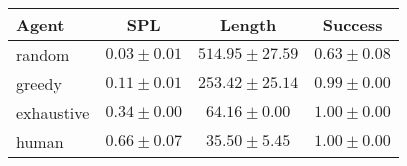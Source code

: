 \begin{tabular}{lccc}
    \toprule
    Agent & SPL & Length & Success \\
    \midrule
    random & $0.03 \pm 0.01$ & $514.95 \pm 27.59$ & $0.63 \pm 0.08$\\
    greedy & $0.11 \pm 0.01$ & $253.42 \pm 25.14$ & $0.99 \pm 0.00$\\
    exhaustive & $0.34 \pm 0.00$ & $64.16 \pm 0.00$ & $1.00 \pm 0.00$\\
    human & $0.66 \pm 0.07$ & $35.50 \pm 5.45$ & $1.00 \pm 0.00$\\
    \bottomrule
\end{tabular}